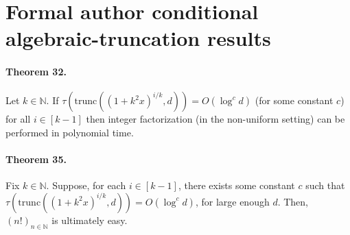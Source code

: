 \section*{Formal author conditional algebraic-truncation results}
\paragraph{Theorem 32.} Let $k\in\mathbb N$. If $\tau(\mathrm{trunc}((1+k^2x)^{i/k},d))=O(\log^cd)$ (for some constant $c$) for all $i\in[k-1]$ then integer factorization (in the non-uniform setting) can be performed in polynomial time.
\paragraph{Theorem 35.} Fix $k\in\mathbb N$. Suppose, for each $i\in[k-1]$, there exists some constant $c$ such that $\tau(\mathrm{trunc}((1+k^2x)^{i/k},d))=O(\log^cd)$, for large enough $d$. Then, $(n!)_{n\in\mathbb N}$ is ultimately easy.
